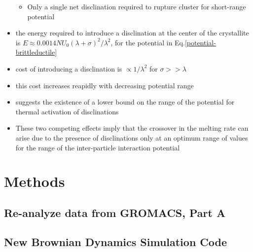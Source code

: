 \documentclass{umthesis}          %
\begin{document}
\begin{itemize}
\begin{itemize}
\item Only a single net disclination required to rupture cluster for short-range potential\\
\label{sec-3.1.5.8.5}

\end{itemize} %

\item the energy required to introduce a disclination at the center of the crystallite is $E \approx 0.0014 N U_0 (\lambda + \sigma)^2/\lambda^2$, for the potential in Eq.\ref{potential-brittleductile}\\
\label{sec-3.1.5.9}


\item cost of introducing a disclination is $\propto 1/\lambda^2$ for  $\sigma >> \lambda$\\
\label{sec-3.1.5.10}


\item this cost increases reapidly with decreasing potential range\\
\label{sec-3.1.5.11}


\item suggests the existence of a lower bound on the range of the potential for thermal activation of disclinations\\
\label{sec-3.1.5.12}


\item These two competing effects imply that the crossover in the melting rate can arise due to the presence of disclinations only at an optimum range of values for the range of the inter-particle interaction potential\\
\label{sec-3.1.5.13}


\end{itemize} %
\section{Methods}
\label{sec-3.2}

\subsection{Re-analyze data from GROMACS, Part A}
\label{sec-3.2.1}

\subsection{New Brownian Dynamics Simulation Code}
\label{sec-3.2.2}
\end{document}
